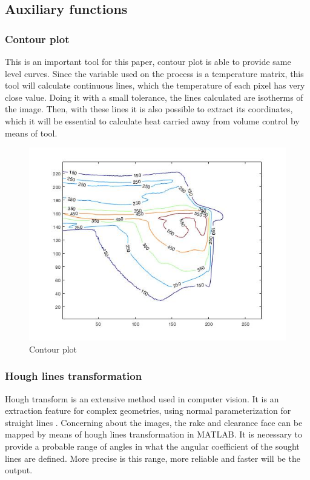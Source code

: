 	\subsection{Auxiliary functions}
		\subsubsection{Contour plot}
		\label{ch:seccontour}
			This is an important tool for this paper, contour plot is able to provide same level curves. Since the variable used on the process is a temperature matrix, this tool will calculate continuous lines, which the temperature of each pixel has very close value. Doing it with a small tolerance, the lines calculated are isotherms of the image. Then, with these lines it is also possible to extract its coordinates, which it will be essential to calculate heat carried away from volume control by means of tool.

			\begin{figure}[H]
				\centering
				\captionsetup{justification=centering}
				\includegraphics[scale=0.6]{Cap4/contour.jpg}
				\caption{Contour plot}
				\label{fig:contour}
			\end{figure}

		\subsubsection{Hough lines transformation}
		\label{ch:sechough}
			Hough transform is an extensive method used in computer vision. It is an extraction feature for complex geometries, using normal parameterization for straight lines \cite{duda1972use}. Concerning about the images, the rake and clearance face can be mapped by means of hough lines transformation in MATLAB. It is necessary to provide a probable range of angles in what the angular coefficient of the sought lines are defined. More precise is this range, more reliable and faster will be the output.

